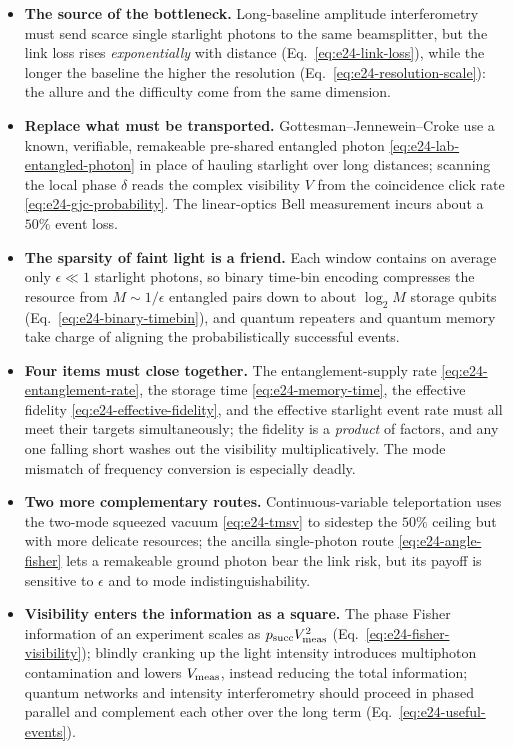 \begin{itemize}
\item \textbf{The source of the bottleneck.} Long-baseline amplitude interferometry must send scarce single starlight photons to the same beamsplitter, but the link loss rises \emph{exponentially} with distance (Eq.\ \eqref{eq:e24-link-loss}), while the longer the baseline the higher the resolution (Eq.\ \eqref{eq:e24-resolution-scale}): the allure and the difficulty come from the same dimension.
\item \textbf{Replace what must be transported.} Gottesman--Jennewein--Croke use a known, verifiable, remakeable pre-shared entangled photon \eqref{eq:e24-lab-entangled-photon} in place of hauling starlight over long distances; scanning the local phase \(\delta\) reads the complex visibility \(V\) from the coincidence click rate \eqref{eq:e24-gjc-probability}. The linear-optics Bell measurement incurs about a \(50\%\) event loss.
\item \textbf{The sparsity of faint light is a friend.} Each window contains on average only \(\epsilon\ll1\) starlight photons, so binary time-bin encoding compresses the resource from \(M\sim1/\epsilon\) entangled pairs down to about \(\log_2 M\) storage qubits (Eq.\ \eqref{eq:e24-binary-timebin}), and quantum repeaters and quantum memory take charge of aligning the probabilistically successful events.
\item \textbf{Four items must close together.} The entanglement-supply rate \eqref{eq:e24-entanglement-rate}, the storage time \eqref{eq:e24-memory-time}, the effective fidelity \eqref{eq:e24-effective-fidelity}, and the effective starlight event rate must all meet their targets simultaneously; the fidelity is a \emph{product} of factors, and any one falling short washes out the visibility multiplicatively. The mode mismatch of frequency conversion is especially deadly.
\item \textbf{Two more complementary routes.} Continuous-variable teleportation uses the two-mode squeezed vacuum \eqref{eq:e24-tmsv} to sidestep the \(50\%\) ceiling but with more delicate resources; the ancilla single-photon route \eqref{eq:e24-angle-fisher} lets a remakeable ground photon bear the link risk, but its payoff is sensitive to \(\epsilon\) and to mode indistinguishability.
\item \textbf{Visibility enters the information as a square.} The phase Fisher information of an experiment scales as \(p_{\rm succ}V_{\rm meas}^2\) (Eq.\ \eqref{eq:e24-fisher-visibility}); blindly cranking up the light intensity introduces multiphoton contamination and lowers \(V_{\rm meas}\), instead reducing the total information; quantum networks and intensity interferometry should proceed in phased parallel and complement each other over the long term (Eq.\ \eqref{eq:e24-useful-events}).
\end{itemize}

